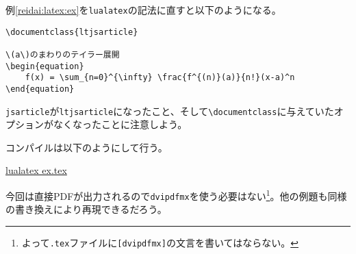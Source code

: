 例\ref{reidai:latex:ex}を\texttt{lualatex}の記法に直すと以下のようになる。

\begin{reidai}
    \label{reidai:latex:exlua}
    \begin{verbatim}
\documentclass{ltjsarticle}

\(a\)のまわりのテイラー展開
\begin{equation}
    f(x) = \sum_{n=0}^{\infty} \frac{f^{(n)}(a)}{n!}(x-a)^n
\end{equation}

\end{verbatim}
\end{reidai} \noindent

\texttt{jsarticle}が\texttt{ltjsarticle}になったこと、そして\texttt{\textbackslash documentclass}に与えていたオプションがなくなったことに注意しよう。

コンパイルは以下のようにして行う。

\begin{commandline2}
    \prompt \underline{lualatex ex.tex}
\end{commandline2} \noindent

今回は直接PDFが出力されるので\texttt{dvipdfmx}を使う必要はない\footnote{よって\texttt{.tex}ファイルに\texttt{[dvipdfmx]}の文言を書いてはならない。}。他の例題も同様の書き換えにより再現できるだろう。
